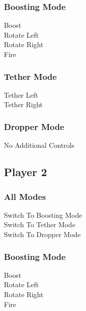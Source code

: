 \documentclass[10pt,a4paper]{article}
\begin{document}
\subsubsection*{Boosting Mode}

 \makebox[0.5cm]{-} Boost
\\ \makebox[0.5cm]{-} Rotate Left
\\ \makebox[0.5cm]{-} Rotate Right
\\ \makebox[0.5cm]{-} Fire

\subsubsection*{Tether Mode}

 \makebox[0.5cm]{-} Tether Left
\\ \makebox[0.5cm]{-} Tether Right

\subsubsection*{Dropper Mode}

No Additional Controls

\subsection{Player 2}


\subsubsection{All Modes}

 \makebox[0.5cm]{-} Switch To Boosting Mode
\\\makebox[1cm]{[} \makebox[0.5cm]{-} Switch To Tether Mode
\\\makebox[1cm]{]} \makebox[0.5cm]{-} Switch To Dropper Mode

\subsubsection*{Boosting Mode}

 \makebox[0.5cm]{-} Boost
\\ \makebox[0.5cm]{-} Rotate Left
\\ \makebox[0.5cm]{-} Rotate Right
\\ \makebox[0.5cm]{-} Fire
\end{document}
